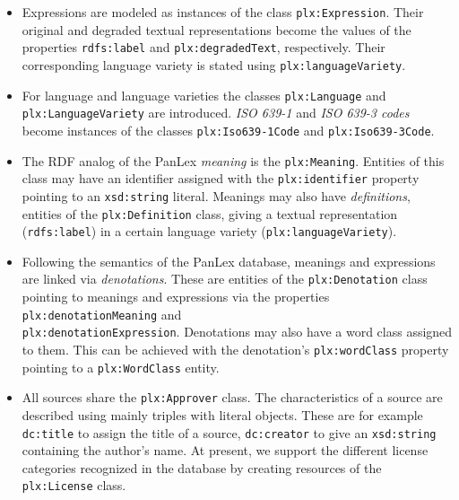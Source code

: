 \documentclass[sw]{iosart2c}
\begin{document}
\begin{itemize}
  \item Expressions are modeled as instances of the class \texttt{\small plx:Expression}.
    Their original and degraded textual representations become the values of the properties \texttt{\small rdfs:label} and \texttt{\small plx:degradedText}, respectively.
    Their corresponding language variety is stated using \texttt{\small plx:languageVariety}.
  \item For language and language varieties the classes \texttt{\small plx:Language} and \texttt{\small plx:LanguageVariety} are introduced.
    \emph{ISO 639-1} and \emph{ISO 639-3 codes} become instances of the classes \texttt{\small plx:Iso639-1Code} and \texttt{\small plx:Iso639-3Code}.
  \item The RDF analog of the PanLex \emph{meaning} is the \texttt{\small plx:Meaning}.
    Entities of this class may have an identifier assigned with the \texttt{\small plx:identifier} property pointing to an \texttt{\small xsd:string} literal.
    Meanings may also have \emph{definitions}, entities of the \texttt{\small plx:Definition} class, giving a textual representation (\texttt{\small rdfs:label}) in a certain language variety (\texttt{\small plx:languageVariety}).
  \item Following the semantics of the PanLex database, meanings and expressions are linked via \emph{denotations}.
    These are entities of the \texttt{\small plx:Denotation} class pointing to meanings and expressions via the properties \texttt{\small plx:denotationMeaning} and \\ \texttt{\small plx:denotationExpression}.
    Denotations may also have a word class assigned to them.
    This can be achieved with the denotation's \texttt{\small plx:wordClass} property pointing to a \texttt{\small plx:WordClass} entity.
  \item All sources share the \texttt{\small plx:Approver} class.
    The characteristics of a source are described using mainly triples with literal objects.
    These are for example \texttt{\small dc:title} to assign the title of a source, \texttt{\small dc:creator} to give an \texttt{\small xsd:string} containing the author's name. At present, we support the different license categories recognized in the database by creating resources of the \texttt{\small plx:License} class.
\end{itemize}
\end{document}

